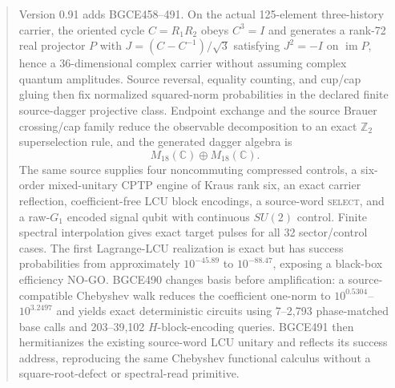 \documentclass[11pt]{article}
\theoremstyle{definition}
\theoremstyle{remark}
\begin{document}
\begin{abstract}
Version 0.91 adds BGCE458--491. On the actual 125-element three-history carrier, the oriented cycle $C=R_1R_2$ obeys $C^3=I$ and generates a rank-72 real projector $P$ with $J=(C-C^{-1})/\sqrt3$ satisfying $J^2=-I$ on $\operatorname{im}P$, hence a 36-dimensional complex carrier without assuming complex quantum amplitudes. Source reversal, equality counting, and cup/cap gluing then fix normalized squared-norm probabilities in the declared finite source-dagger projective class. Endpoint exchange and the source Brauer crossing/cap family reduce the observable decomposition to an exact $\mathbb Z_2$ superselection rule, and the generated dagger algebra is
\[
M_{18}(\mathbb C)\oplus M_{18}(\mathbb C).
\]
The same source supplies four noncommuting compressed controls, a six-order mixed-unitary CPTP engine of Kraus rank six, an exact carrier reflection, coefficient-free LCU block encodings, a source-word \textsc{select}, and a raw-$G_1$ encoded signal qubit with continuous $SU(2)$ control. Finite spectral interpolation gives exact target pulses for all 32 sector/control cases. The first Lagrange-LCU realization is exact but has success probabilities from approximately $10^{-45.89}$ to $10^{-88.47}$, exposing a black-box efficiency NO-GO. BGCE490 changes basis before amplification: a source-compatible Chebyshev walk reduces the coefficient one-norm to $10^{0.5304}$--$10^{3.2497}$ and yields exact deterministic circuits using 7--2,793 phase-matched base calls and 203--39,102 $H$-block-encoding queries. BGCE491 then hermitianizes the existing source-word LCU unitary and reflects its success address, reproducing the same Chebyshev functional calculus without a square-root-defect or spectral-read primitive.


\end{abstract}
\end{document}
